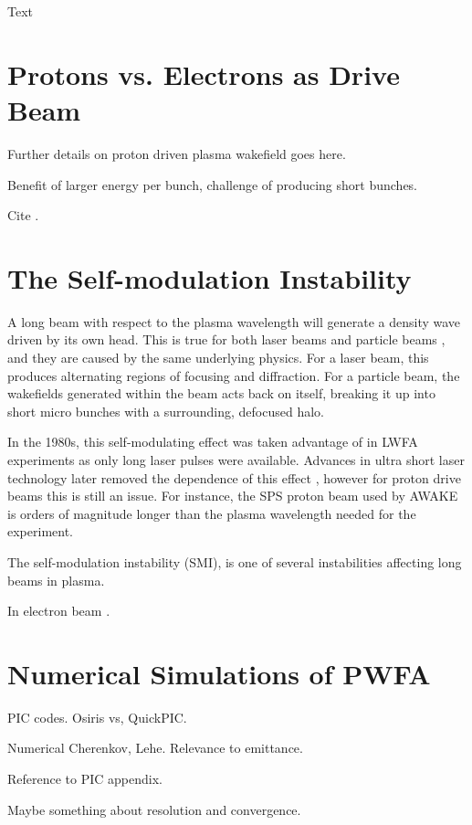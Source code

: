 Text

\section{Protons vs. Electrons as Drive Beam}
\label{Int:PDPWFA}

Further details on proton driven plasma wakefield goes here.

Benefit of larger energy per bunch, challenge of producing short bunches.

Cite \cite{adli:2016a}.

\section{The Self-modulation Instability}
\label{Int:SMI}

A long beam with respect to the plasma wavelength will generate a density wave driven by its own head. This is true for both laser beams \cite{esarey:1994} and particle beams \cite{kumar:2010}, and they are caused by the same underlying physics. For a laser beam, this produces alternating regions of focusing and diffraction. For a particle beam, the wakefields generated within the beam acts back on itself, breaking it up into short micro bunches with a surrounding, defocused halo.

In the 1980s, this self-modulating effect was taken advantage of in LWFA experiments as only long laser pulses were available. Advances in ultra short laser technology later removed the dependence of this effect \cite{pukhov:2002}, however for proton drive beams this is still an issue. For instance, the SPS proton beam used by AWAKE is orders of magnitude longer than the plasma wavelength needed for the experiment.

The self-modulation instability (SMI), is one of several instabilities affecting long beams in plasma.


In electron beam \cite{muggli:2014}.

\section{Numerical Simulations of PWFA}
\label{Int:Sim}

PIC codes. Osiris vs, QuickPIC.

Numerical Cherenkov, Lehe. Relevance to emittance.

Reference to PIC appendix.

Maybe something about resolution and convergence.


